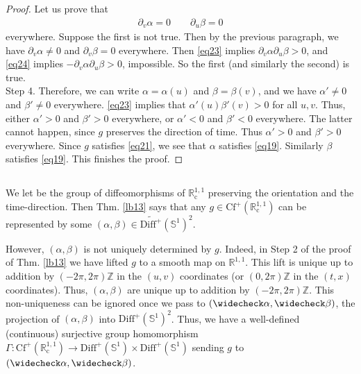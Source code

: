 \documentclass[12pt,b5paper,notitlepage]{article}
\theoremstyle{definition}
\theoremstyle{plain}
\newcommand{\wch}{\widecheck}
\newcommand{\mbb}{\mathbb}
\newcommand{\Zbb}{\mathbb Z}
\newcommand{\Rc}{\mathbb R^{1,1}_{\mathrm{c}}}
\newcommand{\Cf}{\mathrm{Cf}}
\newcommand{\DiffS}{\mathrm{Diff}^+(\mathbb S^1)}
\newcommand{\WDS}{\widetilde{\mathrm{Diff}^+}(\mathbb S^1)}
\numberwithin{equation}{section}
\begin{document}
\begin{proof}
Let us prove that
\begin{align*}
\partial_v\alpha=0\qquad \partial_u\beta=0
\end{align*}
everywhere. Suppose the first is not true. Then by the previous paragraph, we have  $\partial_v\alpha\neq0$ and $\partial_v\beta=0$ everywhere. Then \eqref{eq23} implies $\partial_v\alpha\partial_u\beta>0$, and \eqref{eq24} implies $-\partial_v\alpha\partial_u\beta>0$, impossible. So the first (and similarly the second) is true.\\[-1ex]

Step 4. Therefore, we can write $\alpha=\alpha(u)$ and $\beta=\beta(v)$, and we have $\alpha'\neq0$ and $\beta'\neq0$ everywhere. \eqref{eq23} implies that $\alpha'(u)\beta'(v)>0$ for all $u,v$. Thus, either $\alpha'>0$ and $\beta'>0$ everywhere, or $\alpha'<0$ and $\beta'<0$ everywhere. The latter cannot happen, since $g$ preserves the direction of time. Thus $\alpha'>0$ and $\beta'>0$ everywhere. Since $g$  satisfies \eqref{eq21}, we see that $\alpha$ satisfies \eqref{eq19}. Similarly $\beta$ satisfies \eqref{eq19}. This finishes the proof.
\end{proof}


\subsection{}

We let \pmb{$\Cf^+(\Rc)$} \index{CfR@$\Cf^+(\Rc)$} be the group of diffeomorphisms of $\Rc$ preserving the orientation and the time-direction. Then Thm. \ref{lb13} says that any $g\in\Cf^+(\Rc)$ can be represented by some $(\alpha,\beta)\in\WDS^2$. 

However, $(\alpha,\beta)$ is not uniquely determined by $g$. Indeed, in Step 2 of the proof of Thm. \ref{lb13} we have lifted $g$ to a smooth map on $\mbb R^{1,1}$. This lift is unique up to addition by $(-2\pi,2\pi)\Zbb$ in the $(u,v)$ coordinates (or $(0,2\pi)\Zbb$ in the $(t,x)$ coordinates). Thus, $(\alpha,\beta)$ are unique up to addition by $(-2\pi,2\pi)\Zbb$. This non-uniqueness can be ignored once we pass to $(\wch\alpha,\wch\beta)$, the projection of $(\alpha,\beta)$ into $\DiffS^2$. Thus, we have a well-defined (continuous) surjective group homomorphism $\Gamma:\Cf^+(\Rc)\rightarrow\DiffS\times\DiffS$ sending $g$ to $(\wch \alpha,\wch\beta)$. 
\end{document}
